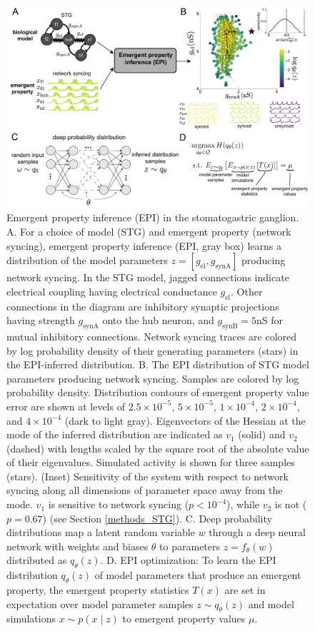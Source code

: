 \documentclass[11pt]{article}
\begin{document}
\begin{figure}
\begin{center}
\includegraphics[scale=0.32]{figures/fig1/fig1.pdf}
\end{center}
\caption{Emergent property inference (EPI) in the stomatogastric ganglion.  A. For a choice of model (STG) and emergent property (network syncing), emergent property inference (EPI, gray box) learns a distribution of the model parameters $z = \left[g_{\text{el}}, g_{\text{synA}} \right]$ producing network syncing.  In the STG model, jagged connections indicate electrical coupling having electrical conductance $g_{\text{el}}$. Other connections in the diagram are inhibitory synaptic projections having strength $g_{\text{synA}}$ onto the hub neuron, and $g_{\text{synB}}=5$nS for mutual inhibitory connections.  Network syncing traces are colored by log probability density of their generating parameters (stars) in the EPI-inferred distribution.  B. The EPI distribution of STG model parameters producing network syncing.  Samples are colored by log probability density.  Distribution contours of emergent property value error are shown at levels of $2.5 \times 10^{-5}$, $5 \times 10^{-5}$, $1 \times 10^{-4}$, $2 \times 10^{-4}$, and $4 \times 10^{-4}$ (dark to light gray).  Eigenvectors of the Hessian at the mode of the inferred distribution are indicated as $v_1$ (solid) and $v_2$ (dashed) with lengths scaled by the square root of the absolute value of their eigenvalues.  Simulated activity is shown for three samples (stars). (Inset) Sensitivity of the system with respect to network syncing along all dimensions of parameter space away from the mode.  $v_1$ is sensitive to network syncing ($p<10^{-4}$), while $v_2$ is not ($p=0.67$) (see Section \ref{methods_STG}).  C. Deep probability distributions map a latent random variable $w$ through a deep neural network with weights and biases $\theta$ to parameters $z = f_\theta(w)$ distributed as $q_\theta(z)$. D. EPI optimization: To learn the EPI distribution $q_\theta(z)$ of model parameters that produce an emergent property, the emergent property statistics $T(x)$ are set in expectation over model parameter samples $z \sim q_\theta(z)$ and model simulations $x \sim p(x \mid z)$ to emergent property values $\mu$.}
 \label{fig:STG}
\end{figure}
\end{document}
